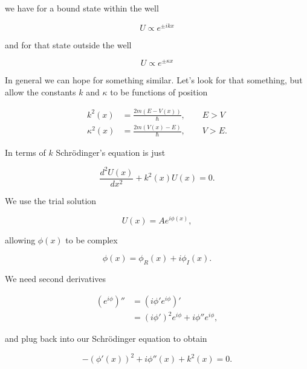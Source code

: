 we have for a bound state within the well

\begin{equation}\label{eqn:qmTwoL12:50}
U \propto e^{\pm i k x}
\end{equation}

and for that state outside the well

\begin{equation}\label{eqn:qmTwoL12:70}
U \propto e^{\pm \kappa x}
\end{equation}

In general we can hope for something similar.  Let's look for that something, but allow the constants $k$ and $\kappa$ to be functions of position

\begin{align}\label{eqn:qmTwoL12:110}
k^2(x) &= \frac{2m (E - V(x))}{\hbar},\qquad E > V \\
\kappa^2(x) &= \frac{2m (V(x) - E)}{\hbar}, \qquad V > E.
\end{align}

In terms of $k$ Schr\"{o}dinger's equation is just

\begin{equation}\label{eqn:qmTwoL12:130}
\frac{d^2 U(x)}{dx^2} + k^2(x) U(x) = 0.
\end{equation}

We use the trial solution 

\begin{equation}\label{eqn:qmTwoL12:150}
U(x) = A e^{i \phi(x)},
\end{equation}

allowing $\phi(x)$ to be complex

\begin{equation}\label{eqn:qmTwoL12:170}
\phi(x) = \phi_R(x) + i \phi_I(x).
\end{equation}

We need second derivatives

\begin{align*}
(e^{i \phi})'' 
&=
(i \phi' e^{i \phi})'  \\
&=
(i \phi')^2 e^{i \phi} + i \phi'' e^{i \phi},
\end{align*}

and plug back into our Schr\"{o}dinger equation to obtain

\begin{equation}\label{eqn:qmTwoL12:190}
- (\phi'(x))^2 + i \phi''(x) + k^2(x) = 0.
\end{equation}

